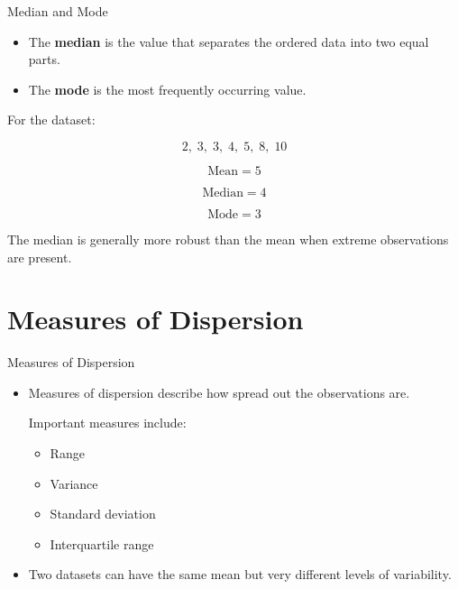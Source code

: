\documentclass{beamer}
\begin{document}
\begin{frame}{Median and Mode}

\begin{itemize}

  \item The \textbf{median} is the value that separates the ordered data into two equal parts.

  \vskip 0.3cm

  \item The \textbf{mode} is the most frequently occurring value.

\end{itemize}

\vskip 0.5cm

For the dataset:

\[
2,\;3,\;3,\;4,\;5,\;8,\;10
\]

\vskip 0.3cm

\[
\text{Mean} = 5
\]

\[
\text{Median} = 4
\]

\[
\text{Mode} = 3
\]

\vskip 0.4cm

The median is generally more robust than the mean when extreme observations are present.

\end{frame}



\section{Measures of Dispersion}

\begin{frame}{Measures of Dispersion}

\begin{itemize}

  \item Measures of dispersion describe how spread out the observations are.

  \vskip 0.4cm

  Important measures include:

  \begin{itemize}
    \item Range
    \item Variance
    \item Standard deviation
    \item Interquartile range
  \end{itemize}

  \vskip 0.4cm

  \item Two datasets can have the same mean but very different levels of variability.

\end{itemize}

\end{frame}
\end{document}
